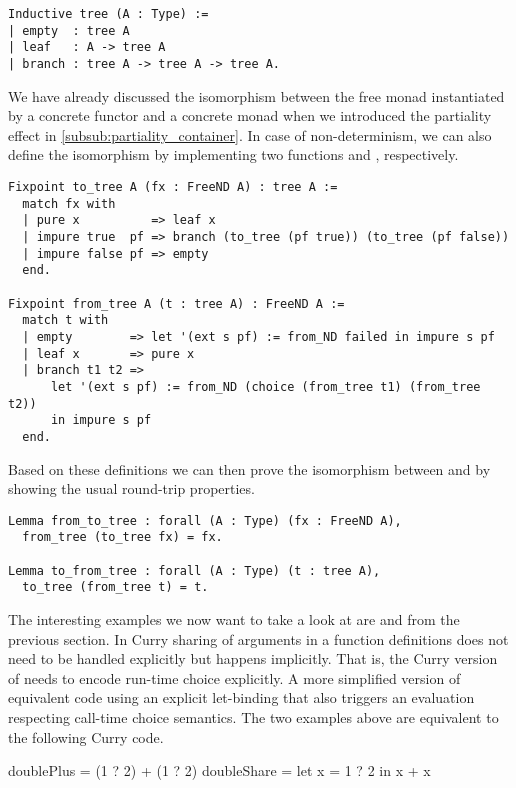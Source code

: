 \begin{verbatim}
Inductive tree (A : Type) :=
| empty  : tree A
| leaf   : A -> tree A
| branch : tree A -> tree A -> tree A.
\end{verbatim}

We have already discussed the isomorphism between the free monad instantiated by a concrete functor and a concrete monad when we introduced the partiality effect in \autoref{subsub:partiality_container}.
In case of non-determinism, we can also define the isomorphism by implementing two functions  and , respectively.

\begin{verbatim}
Fixpoint to_tree A (fx : FreeND A) : tree A :=
  match fx with
  | pure x          => leaf x
  | impure true  pf => branch (to_tree (pf true)) (to_tree (pf false))
  | impure false pf => empty
  end.

Fixpoint from_tree A (t : tree A) : FreeND A :=
  match t with
  | empty        => let '(ext s pf) := from_ND failed in impure s pf
  | leaf x       => pure x
  | branch t1 t2 =>
      let '(ext s pf) := from_ND (choice (from_tree t1) (from_tree t2))
      in impure s pf
  end.
\end{verbatim}

Based on these definitions we can then prove the isomorphism between  and  by showing the usual round-trip properties.

\begin{verbatim}
Lemma from_to_tree : forall (A : Type) (fx : FreeND A),
  from_tree (to_tree fx) = fx.

Lemma to_from_tree : forall (A : Type) (t : tree A),
  to_tree (from_tree t) = t.
\end{verbatim}

The interesting examples we now want to take a look at are  and  from the
previous section.
In Curry sharing of arguments in a function definitions does not need to be handled explicitly but happens implicitly.
That is, the Curry version of  needs to encode run-time choice explicitly.
A more simplified version of equivalent code using an explicit let-binding that also triggers an evaluation respecting call-time
choice semantics.
The two examples above are equivalent to the following Curry code.

\begin{curry}
doublePlus = (1 ? 2) + (1 ? 2)
doubleShare = let x = 1 ? 2 in x + x
\end{curry}


